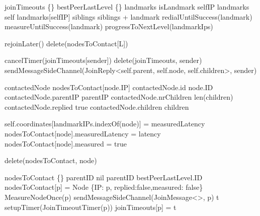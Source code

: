 \begin{algorithm}
\begin{algorithmic}[1]

    
        \State joinTimeouts \asdassign \{\}
        \State bestPeerLastLevel \asdassign \{\}
        \State landmarks \asdassign []
        \State isLandmark \asdassign selfIP \asdin landmarks
            \State self \asdassign landmarks[selfIP]
                \State siblings \asdassign siblings + landmark
                \State redialUntilSuccess(landmark)
                \State measureUntilSuccess(landmark)
            \EndFor
        \Else 
            \State progressToNextLevel(landmarkIps)
        \EndIf
    \asdend
    
\asdupon[JoinTimeoutTimer(L)]
            \State rejoinLater()
        \Else
            \State delete(nodesToContact[L])
        \EndIf
    \asdend
    
        \State cancelTimer(joinTimeouts[sender])
        \State delete(joinTimeouts, sender)
        \State sendMessageSideChannel(JoinReply<self.parent, self.node, self.children>, sender)
    \asdend
    
        \State contactedNode \asdassign nodesToContact[node.IP]
        \State contactedNode.id \asdassign node.ID
        \State contactedNode.parentIP \asdassign parentIP
        \State contactedNode.nrChildren \asdassign len(children)
        \State contactedNode.replied \asdassign true
        \State contactedNode.children \asdassign children
    \asdend
   
            \State self.coordinates[landmarkIPs.indexOf(node)] = measuredLatency
        \EndIf
        \State nodesToContact[node].measuredLatency = latency
        \State nodesToContact[node].measured = true
    \asdend
        
    \State delete(nodesToContact, node)
\asdend

    \State nodesToContact \asdassign \{\}
    \State parentID \asdassign  nil
        \State parentID \asdassign  bestPeerLastLevel.ID
    \EndIf
        \State nodesToContact[p] = Node \{IP: p, replied:false,measured: false\}
        \State MeasureNodeOnce(p) 
        \State sendMessageSideChannel(JoinMessage<>, p)
        \State t \asdassign setupTimer(JoinTimeoutTimer(p))
        \State joinTimeouts[p] = t
    \EndFor
\asdend

\end{algorithmic}
\end{algorithm}

